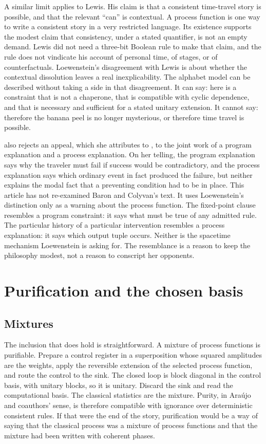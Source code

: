 \documentclass[11pt]{article}
\begin{document}
A similar limit applies to Lewis. His claim is that a consistent time-travel story is possible, and that the relevant ``can'' is contextual. A process function is one way to write a consistent story in a very restricted language. Its existence supports the modest claim that consistency, under a stated quantifier, is not an empty demand. Lewis did not need a three-bit Boolean rule to make that claim, and the rule does not vindicate his account of personal time, of stages, or of counterfactuals. Loewenstein's disagreement with Lewis is about whether the contextual dissolution leaves a real inexplicability. The alphabet model can be described without taking a side in that disagreement. It can say: here is a constraint that is not a chaperone, that is compatible with cyclic dependence, and that is necessary and sufficient for a stated unitary extension. It cannot say: therefore the banana peel is no longer mysterious, or therefore time travel is possible.

\citet{loewenstein2022} also rejects an appeal, which she attributes to \citet{baron2016}, to the joint work of a program explanation and a process explanation. On her telling, the program explanation says why the traveler must fail if success would be contradictory, and the process explanation says which ordinary event in fact produced the failure, but neither explains the modal fact that a preventing condition had to be in place. This article has not re-examined Baron and Colyvan's text. It uses Loewenstein's distinction only as a warning about the process function. The fixed-point clause resembles a program constraint: it says what must be true of any admitted rule. The particular history of a particular intervention resembles a process explanation: it says which output tuple occurs. Neither is the spacetime mechanism Loewenstein is asking for. The resemblance is a reason to keep the philosophy modest, not a reason to conscript her opponents.

\section{Purification and the chosen basis}
\label{sec:pur}

\subsection{Mixtures}
\label{sec:mix}

The inclusion that does hold is straightforward. A mixture of process functions is purifiable. Prepare a control register in a superposition whose squared amplitudes are the weights, apply the reversible extension of the selected process function, and route the control to the sink. The closed loop is block diagonal in the control basis, with unitary blocks, so it is unitary. Discard the sink and read the computational basis. The classical statistics are the mixture. Purity, in Ara\'ujo and coauthors' sense, is therefore compatible with ignorance over deterministic consistent rules. If that were the end of the story, purification would be a way of saying that the classical process was a mixture of process functions and that the mixture had been written with coherent phases.
\end{document}
